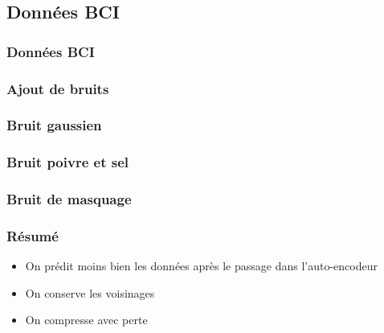 \documentclass{beamer}
\begin{document}
\subsection{Données BCI}

\begin{frame}
\frametitle{Données BCI}

\end{frame}

\begin{frame}
\frametitle{Ajout de bruits}

\end{frame}
\begin{frame}
\frametitle{Bruit gaussien}

\end{frame}

\begin{frame}
\frametitle{Bruit poivre et sel}

\end{frame}

\begin{frame}
\frametitle{Bruit de masquage}

\end{frame}

\begin{frame}
\frametitle{Résumé}
\begin{itemize}
    \item On prédit moins bien les données après le passage dans l'auto-encodeur
    \item On conserve les voisinages
    \item On compresse avec perte
\end{itemize}
\end{frame}


\end{document}
